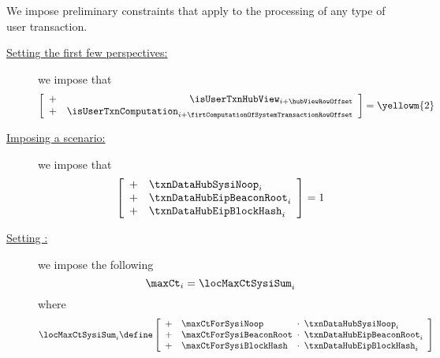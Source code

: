 \begin{center}
\end{center}
We impose preliminary constraints that apply to the processing of any type of user transaction.
\begin{description}
	\item[\underline{Setting the first few perspectives:}]
		we impose that
		\[
			\left[ \begin{array}{cr}
				+ & \isUserTxnHubView     _{i + \hubViewRowOffset                            } \\
				+ & \isUserTxnComputation _{i + \firtComputationOfSystemTransactionRowOffset } \\
			\end{array} \right]
			=
			\yellowm{2}
		\]
	\item[\underline{Imposing a scenario:}]
		we impose that
		\[
			\left[ \begin{array}{clcl}
				+ & \txnDataHubSysiNoop       _{i} \\
				+ & \txnDataHubEipBeaconRoot  _{i} \\
				+ & \txnDataHubEipBlockHash   _{i} \\
			\end{array} \right]
			= 1
		\]
	\item[\underline{Setting \maxCt{}:}]
		we impose the following
		\[
			\maxCt _{i} = \locMaxCtSysiSum _{i}
		\]
		where
		\[
			\locMaxCtSysiSum _{i}
			\define
			\left[ \begin{array}{clcl}
				+ & \maxCtForSysiNoop       & \!\!\!\cdot\!\!\! & \txnDataHubSysiNoop       _{i} \\
				+ & \maxCtForSysiBeaconRoot & \!\!\!\cdot\!\!\! & \txnDataHubEipBeaconRoot  _{i} \\
				+ & \maxCtForSysiBlockHash  & \!\!\!\cdot\!\!\! & \txnDataHubEipBlockHash   _{i} \\
			\end{array} \right]
		\]
\end{description}
